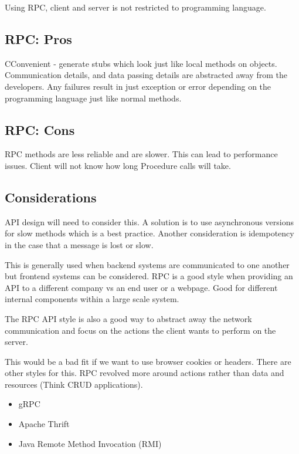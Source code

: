 \documentclass[a4paper, 11pt]{book}
\begin{document}
    Using RPC, client and server is not restricted to programming language.

    \subsection{RPC: Pros}
    CConvenient - generate stubs which look just like local methods on objects.
    Communication details, and data passing details are abstracted away from the developers.
    Any failures result in just exception or error depending on the programming language just like normal methods.

    \subsection{RPC: Cons}
    RPC methods are less reliable and are slower.
    This can lead to performance issues.
    Client will not know how long Procedure calls will take.

    \subsection{Considerations}
    API design will need to consider this.
    A solution is to use asynchronous versions for slow methods which is a best practice.
    Another consideration is idempotency in the case that a message is lost or slow.

    This is generally used when backend systems are communicated to one another but frontend systems can be considered.
    RPC is a good style when providing an API to a different company vs an end user or a webpage.
    Good for different internal components within a large scale system.

    The RPC API style is also a good way to abstract away the network communication and focus on the actions the client wants to perform on the server.

    This would be a bad fit if we want to use browser cookies or headers.
    There are other styles for this.
    RPC revolved more around actions rather than data and resources (Think CRUD applications).

    \begin{itemize}
        \item gRPC
        \item Apache Thrift
        \item Java Remote Method Invocation (RMI)
    \end{itemize}
\end{document}
